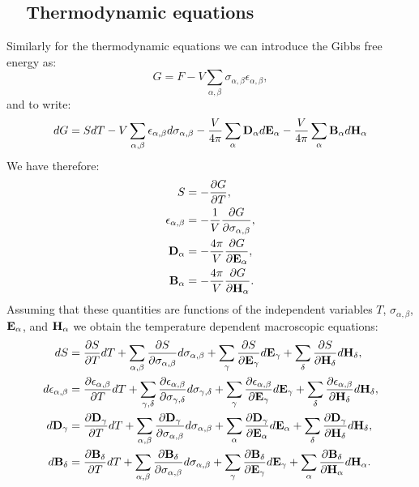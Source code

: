 \documentclass[12pt,a4paper,twoside]{report}
\begin{document}
{\subsection{\color{orange}\ \ Thermodynamic equations}
Similarly for the thermodynamic equations we can introduce the Gibbs
free energy as:
\begin{equation}
G=F - V \sum_{\alpha,\beta} \sigma_{\alpha,\beta} \epsilon_{\alpha,\beta},
\end{equation}
and to write:
\begin{equation}
dG=SdT - V \sum_{\alpha,\beta} \epsilon_{\alpha,\beta} d \sigma_{\alpha,\beta}
-{V \over 4 \pi} \sum_{\alpha} {\bf D}_\alpha d {\bf E}_\alpha
-{V \over 4 \pi} \sum_{\alpha} {\bf B}_\alpha d {\bf H}_\alpha
\end{equation}
We have therefore:
\begin{align}
S&= -{\partial G \over \partial T}, \\
\epsilon_{\alpha,\beta}&= -{1\over V}
{\partial G \over \partial \sigma_{\alpha,\beta}}, \\
{\bf D}_{\alpha}&= -{4 \pi \over V}
{\partial G \over \partial {\bf E}_{\alpha}}, \\
{\bf B}_{\alpha}&= -{4 \pi \over V}
{\partial G \over \partial {\bf H}_{\alpha}}.
\end{align}
Assuming that these quantities are functions of the independent variables
$T$, $\sigma_{\alpha,\beta}$, ${\bf E}_\alpha$, and ${\bf H}_\alpha$ we
obtain the temperature dependent macroscopic equations:
\begin{align}
dS&= {\partial S \over \partial T} dT+\sum_{\alpha,\beta}
{\partial S \over \partial \sigma_{\alpha,\beta}}d\sigma_{\alpha,\beta}
+\sum_\gamma{\partial S \over \partial {\bf E}_{\gamma}}d{\bf E}_{\gamma}+ 
\sum_\delta{\partial S \over \partial {\bf H}_{\delta}}d{\bf H}_{\delta}, \\
d\epsilon_{\alpha,\beta}&=
{\partial \epsilon_{\alpha,\beta} \over \partial T} dT+\sum_{\gamma,\delta}
{\partial \epsilon_{\alpha,\beta} \over \partial 
\sigma_{\gamma,\delta}}d\sigma_{\gamma,\delta}
+\sum_\gamma{\partial \epsilon_{\alpha,\beta} \over \partial 
{\bf E}_{\gamma}}d{\bf E}_{\gamma}+ 
\sum_\delta{\partial \epsilon_{\alpha,\beta} \over \partial 
{\bf H}_{\delta}}d{\bf H}_{\delta}, \\
d{\bf D}_\gamma&= 
{\partial  {\bf D}_\gamma \over \partial T} dT+\sum_{\alpha,\beta}
{\partial {\bf D}_\gamma \over \partial \sigma_{\alpha,\beta}}
d\sigma_{\alpha,\beta}
+\sum_\alpha{\partial {\bf D}_\gamma \over \partial {\bf E}_{\alpha}}d{\bf E}_{\alpha}+ 
\sum_\delta{\partial {\bf D}_\gamma \over \partial {\bf H}_{\delta}}d{\bf H}_{\delta}, \\
d{\bf B}_\delta&= 
{\partial {\bf B}_\delta \over \partial T} dT+\sum_{\alpha,\beta}
{\partial {\bf B}_\delta \over \partial \sigma_{\alpha,\beta}}
d\sigma_{\alpha,\beta}
+\sum_\gamma{\partial {\bf B}_\delta \over \partial {\bf E}_{\gamma}}
d{\bf E}_{\gamma}+ 
\sum_\alpha{\partial {\bf B}_\delta \over \partial {\bf H}_{\alpha}}
d{\bf H}_{\alpha}. 
\end{align}

}
\end{document}
